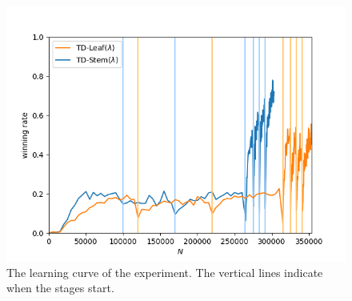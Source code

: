 \begin{figure}
\centering
\includegraphics[scale=0.5]{fig/plots/krk_lc}
\caption[Learning curve experiment 1]{The learning curve of the experiment. The vertical lines indicate when the stages start.}
\label{fig:lc}
\end{figure}

